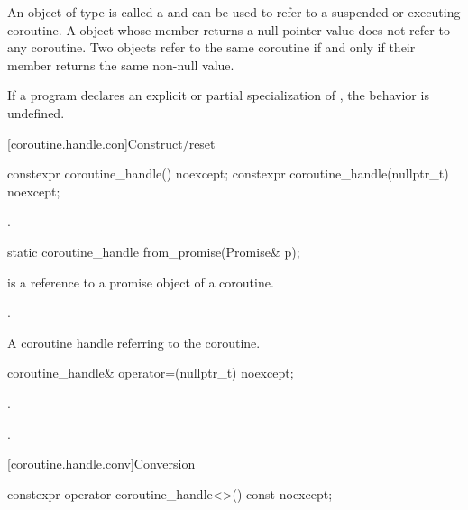 \pnum
An object of type
 is called a 
and can be used to refer to a suspended or executing coroutine.
A  object whose
member  returns a null pointer value
does not refer to any
coroutine.
Two  objects refer to the same coroutine
if and only if their member  returns the same non-null value.

\pnum
If a program declares an explicit or partial specialization of
, the behavior is undefined.

[coroutine.handle.con]{Construct/reset}

%
\begin{itemdecl}
constexpr coroutine_handle() noexcept;
constexpr coroutine_handle(nullptr_t) noexcept;
\end{itemdecl}

\begin{itemdescr}
\pnum
\ensures
{}.
\end{itemdescr}

%
\begin{itemdecl}
static coroutine_handle from_promise(Promise& p);
\end{itemdecl}

\begin{itemdescr}
\pnum
\expects
{} is a reference to a promise object of a coroutine.

\pnum
\ensures
{}.

\pnum
\returns
A coroutine handle  referring to the coroutine.
\end{itemdescr}

%
\begin{itemdecl}
coroutine_handle& operator=(nullptr_t) noexcept;
\end{itemdecl}

\begin{itemdescr}
\pnum
\ensures
{}.

\pnum
\returns
{}.
\end{itemdescr}

[coroutine.handle.conv]{Conversion}

%
\begin{itemdecl}
constexpr operator coroutine_handle<>() const noexcept;
\end{itemdecl}

